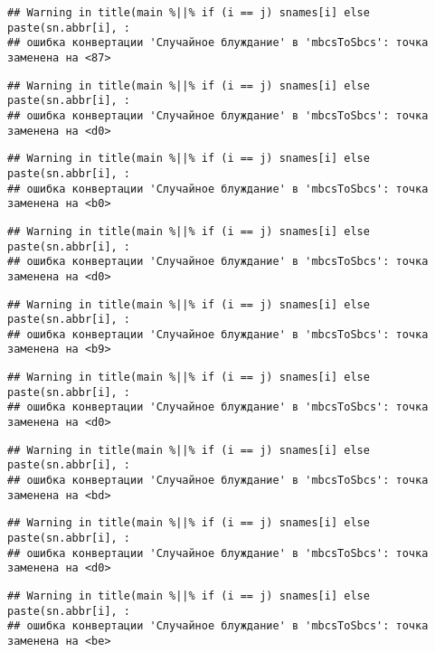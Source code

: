 \documentclass[
]{article}
\begin{document}
\begin{verbatim}
## Warning in title(main %||% if (i == j) snames[i] else paste(sn.abbr[i], :
## ошибка конвертации 'Случайное блуждание' в 'mbcsToSbcs': точка заменена на <87>
\end{verbatim}

\begin{verbatim}
## Warning in title(main %||% if (i == j) snames[i] else paste(sn.abbr[i], :
## ошибка конвертации 'Случайное блуждание' в 'mbcsToSbcs': точка заменена на <d0>
\end{verbatim}

\begin{verbatim}
## Warning in title(main %||% if (i == j) snames[i] else paste(sn.abbr[i], :
## ошибка конвертации 'Случайное блуждание' в 'mbcsToSbcs': точка заменена на <b0>
\end{verbatim}

\begin{verbatim}
## Warning in title(main %||% if (i == j) snames[i] else paste(sn.abbr[i], :
## ошибка конвертации 'Случайное блуждание' в 'mbcsToSbcs': точка заменена на <d0>
\end{verbatim}

\begin{verbatim}
## Warning in title(main %||% if (i == j) snames[i] else paste(sn.abbr[i], :
## ошибка конвертации 'Случайное блуждание' в 'mbcsToSbcs': точка заменена на <b9>
\end{verbatim}

\begin{verbatim}
## Warning in title(main %||% if (i == j) snames[i] else paste(sn.abbr[i], :
## ошибка конвертации 'Случайное блуждание' в 'mbcsToSbcs': точка заменена на <d0>
\end{verbatim}

\begin{verbatim}
## Warning in title(main %||% if (i == j) snames[i] else paste(sn.abbr[i], :
## ошибка конвертации 'Случайное блуждание' в 'mbcsToSbcs': точка заменена на <bd>
\end{verbatim}

\begin{verbatim}
## Warning in title(main %||% if (i == j) snames[i] else paste(sn.abbr[i], :
## ошибка конвертации 'Случайное блуждание' в 'mbcsToSbcs': точка заменена на <d0>
\end{verbatim}

\begin{verbatim}
## Warning in title(main %||% if (i == j) snames[i] else paste(sn.abbr[i], :
## ошибка конвертации 'Случайное блуждание' в 'mbcsToSbcs': точка заменена на <be>
\end{verbatim}
\end{document}
